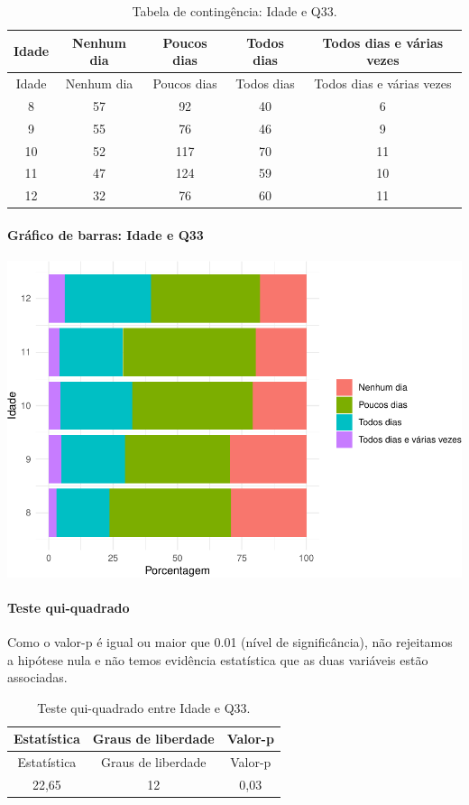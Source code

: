 \documentclass[]{article}
\let\oldparagraph\paragraph
\renewcommand{\paragraph}[1]{\oldparagraph{#1}\mbox{}}
\begin{document}
\begin{longtable}[]{@{}ccccc@{}}
\caption{\label{tab:unnamed-chunk-1153}Tabela de contingência: Idade e Q33.}\tabularnewline
\toprule
Idade & Nenhum dia & Poucos dias & Todos dias & Todos dias e várias vezes\tabularnewline
\midrule
\endfirsthead
\toprule
Idade & Nenhum dia & Poucos dias & Todos dias & Todos dias e várias vezes\tabularnewline
\midrule
\endhead
8 & 57 & 92 & 40 & 6\tabularnewline
9 & 55 & 76 & 46 & 9\tabularnewline
10 & 52 & 117 & 70 & 11\tabularnewline
11 & 47 & 124 & 59 & 10\tabularnewline
12 & 32 & 76 & 60 & 11\tabularnewline
\bottomrule
\end{longtable}

\hypertarget{gruxe1fico-de-barras-idade-e-q33}{%
\paragraph{Gráfico de barras: Idade e Q33}\label{gruxe1fico-de-barras-idade-e-q33}}

\begin{center}\includegraphics[width=0.75\linewidth]{relatorio_covid19_files/figure-latex/unnamed-chunk-1154-1} \end{center}

\hypertarget{teste-qui-quadrado-99}{%
\paragraph{Teste qui-quadrado}\label{teste-qui-quadrado-99}}

Como o valor-p é igual ou maior que 0.01 (nível de significância), não rejeitamos a hipótese nula e não temos evidência estatística que as duas variáveis estão associadas.

\begin{longtable}[]{@{}ccc@{}}
\caption{\label{tab:unnamed-chunk-1156}Teste qui-quadrado entre Idade e Q33.}\tabularnewline
\toprule
Estatística & Graus de liberdade & Valor-p\tabularnewline
\midrule
\endfirsthead
\toprule
Estatística & Graus de liberdade & Valor-p\tabularnewline
\midrule
\endhead
22,65 & 12 & 0,03\tabularnewline
\bottomrule
\end{longtable}
\end{document}
